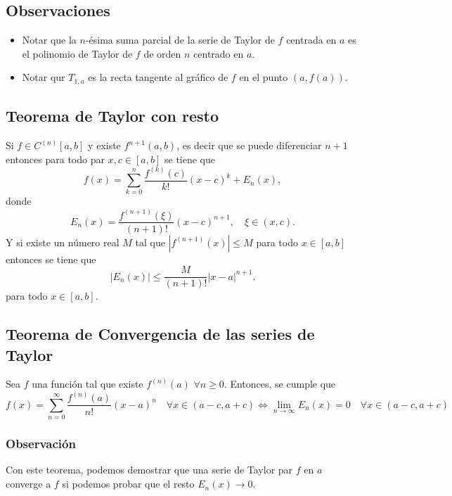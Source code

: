 \documentclass{article}
\begin{document}
\subsection{Observaciones}

\begin{itemize}
    \item Notar que la $n$-ésima suma parcial de la serie de Taylor de $f$ centrada en $a$ es el polinomio de Taylor de $f$ de orden $n$ centrado en $a$.
    \item Notar qur $T_{1,a}$ es la recta tangente al gráfico de $f$ en el punto $(a,f(a))$.
\end{itemize}

\newpage
\subsection{Teorema de Taylor con resto}
Si $f\in C^{(n)}[a,b]$ y existe $f^{n+1}(a,b)$, es decir que se puede diferenciar $n+1$ entonces para todo par $x,c \in [a,b]$ se tiene que 
\begin{equation*}
    f(x) = \sum_{k=0}^{n} \frac{f^{(k)}(c)}{k!}(x-c)^k + E_n(x),
\end{equation*}
donde 
\begin{equation*}
    E_n(x) = \frac{f^{(n+1)}(\xi)}{(n+1)!}(x-c)^{n+1}, \quad \xi \in (x,c).
\end{equation*}
Y si existe un número real $M$ tal que $|f^{(n+1)}(x)|\leq M$ para todo $x\in [a,b]$ entonces se tiene que
\begin{equation*}
    |E_n(x)| \leq \frac{M}{(n+1)!}|x-a|^{n+1}.
\end{equation*}
para todo $x\in [a,b]$.

\subsection{Teorema de Convergencia de las series de Taylor}
Sea $f$ una función tal que existe $f^{(n)}(a)$ $\forall n \geq 0$. Entonces, se cumple que
\begin{equation*}
    f(x) = \sum_{n=0}^{\infty} \frac{f^{(n)}(a)}{n!}(x-a)^n \quad \forall x \in (a-c,a+c) \Leftrightarrow \lim_{n\to\infty} E_n(x) = 0 \quad \forall x \in (a-c,a+c)
\end{equation*}

\subsubsection{Observación}
Con este teorema, podemos demostrar que una serie de Taylor par $f$ en $a$ converge a $f$ si podemos probar que el resto $E_n(x) \to 0$.
\end{document}
